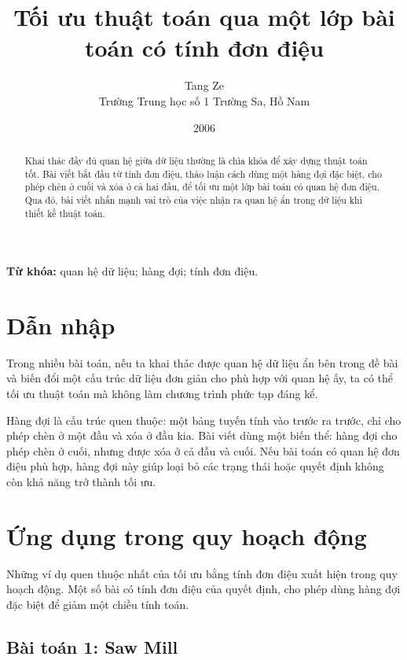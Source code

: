 \documentclass[11pt]{article}
\title{Tối ưu thuật toán qua một lớp bài toán có tính đơn điệu}
\author{Tang Ze\\Trường Trung học số 1 Trường Sa, Hồ Nam}
\date{2006}
\begin{document}
\maketitle


\renewcommand{\abstractname}{Tóm tắt}
\begin{abstract}
Khai thác đầy đủ quan hệ giữa dữ liệu thường là chìa khóa để xây dựng thuật
toán tốt. Bài viết bắt đầu từ tính đơn điệu, thảo luận cách dùng một hàng đợi
đặc biệt, cho phép chèn ở cuối và xóa ở cả hai đầu, để tối ưu một lớp bài toán
có quan hệ đơn điệu. Qua đó, bài viết nhấn mạnh vai trò của việc nhận ra quan
hệ ẩn trong dữ liệu khi thiết kế thuật toán.
\end{abstract}

\noindent\textbf{Từ khóa:} quan hệ dữ liệu; hàng đợi; tính đơn điệu.

\section{Dẫn nhập}

Trong nhiều bài toán, nếu ta khai thác được quan hệ dữ liệu ẩn bên trong đề
bài và biến đổi một cấu trúc dữ liệu đơn giản cho phù hợp với quan hệ ấy, ta
có thể tối ưu thuật toán mà không làm chương trình phức tạp đáng kể.

Hàng đợi là cấu trúc quen thuộc: một bảng tuyến tính vào trước ra trước, chỉ
cho phép chèn ở một đầu và xóa ở đầu kia. Bài viết dùng một biến thể: hàng đợi
cho phép chèn ở cuối, nhưng được xóa ở cả đầu và cuối. Nếu bài toán có quan hệ
đơn điệu phù hợp, hàng đợi này giúp loại bỏ các trạng thái hoặc quyết định
không còn khả năng trở thành tối ưu.

\section{Ứng dụng trong quy hoạch động}

Những ví dụ quen thuộc nhất của tối ưu bằng tính đơn điệu xuất hiện trong quy
hoạch động. Một số bài có tính đơn điệu của quyết định, cho phép dùng hàng
đợi đặc biệt để giảm một chiều tính toán.

\subsection{Bài toán 1: Saw Mill}
\end{document}
